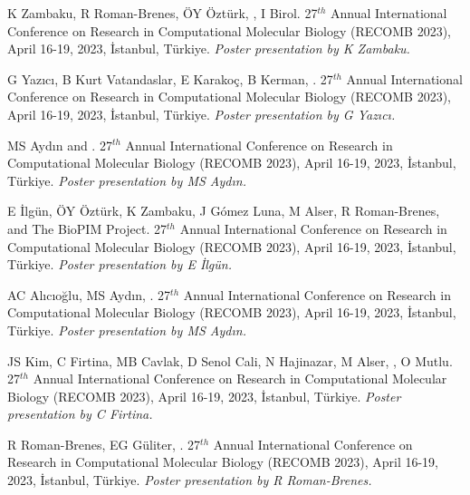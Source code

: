  K Zambaku, R Roman-Brenes, ÖY Öztürk, \calkan{}, I Birol. 27$^{th}$ Annual International Conference on Research in Computational Molecular Biology (RECOMB 2023), April 16-19, 2023, İstanbul, Türkiye. {\it Poster presentation by K Zambaku.}


\vspace{-.2cm}{\bf Identification of protein-protein interaction
bridges in multiple sclerosis.} G Yazıcı, B Kurt Vatandaslar, E Karakoç, B Kerman, \calkan{}.
27$^{th}$ Annual International Conference on Research in Computational Molecular Biology (RECOMB 2023), April 16-19, 2023, İstanbul, Türkiye.
{\it Poster presentation by G Yazıcı.}

\vspace{-.2cm}{\bf Whole genome alignment via Alternating Lyndon Factorization Tree traversal.} MS Aydın and \calkan{}. 27$^{th}$ Annual International Conference on Research in Computational Molecular Biology (RECOMB 2023), April 16-19, 2023, İstanbul, Türkiye. {\it Poster presentation by MS Aydın.}

\vspace{-.2cm}{\bf Characterization of alignment and search algorithms for short read, long read, and graph mappers.} E İlgün, ÖY Öztürk, K Zambaku, J Gómez Luna, M Alser, R Roman-Brenes, \calkan{} and The BioPIM Project. 27$^{th}$ Annual International Conference on Research in Computational Molecular Biology (RECOMB 2023), April 16-19, 2023, İstanbul, Türkiye. {\it Poster presentation by E İlgün.}

\vspace{-.2cm}{\bf Pairwise sequence alignment with block and character edit operations.} AC Alıcıoğlu, MS Aydın, \calkan{}. 27$^{th}$ Annual International Conference on Research in Computational Molecular Biology (RECOMB 2023), April 16-19, 2023, İstanbul, Türkiye. {\it Poster presentation by MS Aydın.}

\vspace{-.2cm}{\bf AirLift: a fast and comprehensive technique for remapping alignments between reference genomes.} JS Kim, C Firtina, MB Cavlak, D Senol Cali, N Hajinazar, M Alser, \calkan{}, O Mutlu. 27$^{th}$ Annual International Conference on Research in Computational Molecular Biology (RECOMB 2023), April 16-19, 2023, İstanbul, Türkiye. {\it Poster presentation by C Firtina.}

\vspace{-.2cm}{\bf Fast identification of sepsis antibiotic resistance.}  R Roman-Brenes, EG Güliter,  \calkan{}. 27$^{th}$ Annual International Conference on Research in Computational Molecular Biology (RECOMB 2023), April 16-19, 2023, İstanbul, Türkiye. {\it Poster presentation by R Roman-Brenes.}

